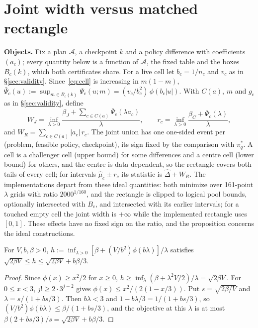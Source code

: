 \documentclass[sigconf,anonymous,review]{acmart}
\newcommand{\cA}{\mathcal{A}}
\begin{document}
\section{Joint width versus matched rectangle}\label{app:widthprop}

\textbf{Objects.} Fix a plan $\cA$, a checkpoint $k$ and a policy difference with coefficients $(a_c)$; every quantity below is a function of $\cA$, the fixed table and the boxes $B_c(k)$, which both certificates share. For a live cell let $b_c = 1/n_c$ and $v_c$ as in \S\ref{sec:validity}. Since~\eqref{eq:cell} is increasing in $m(1-m)$, $\bar\Psi_c(u) := \sup_{m\in B_c(k)} \Psi_c(u;m) = (v_c/b_c^2)\,\phi(b_c|u|)$. With $C(a)$, $m$ and $g_c$ as in \S\ref{sec:validity}, define
\[
W_J = \inf_{\lambda>0}\frac{\beta_J + \sum_{c\in C(a)} \bar\Psi_c(\lambda a_c)}{\lambda},\qquad
r_c = \inf_{\lambda>0}\frac{\beta_C + \bar\Psi_c(\lambda)}{\lambda},
\]
and $W_R = \sum_{c\in C(a)} |a_c|\, r_c$. The joint union has one one-sided event per (problem, feasible policy, checkpoint), its sign fixed by the comparison with $\pi^*_q$. A cell is a challenger cell (upper bound) for some differences and a centre cell (lower bound) for others, and the centre is data-dependent, so the rectangle covers both tails of every cell; for intervals $\hat\mu_c \pm r_c$ its statistic is $\hat\Delta + W_R$. The implementations depart from these ideal quantities: both minimize over 161-point $\lambda$ grids with ratio $2000^{1/160}$, and the rectangle is clipped to logical pool bounds, optionally intersected with $B_c$, and intersected with its earlier intervals; for a touched empty cell the joint width is $+\infty$ while the implemented rectangle uses $[0,1]$. These effects have no fixed sign on the ratio, and the proposition concerns the ideal constructions.

\begin{lemma}\label{lem:sandwich}
For $V, b, \beta > 0$, $h := \inf_{\lambda>0}[\beta + (V/b^2)\phi(b\lambda)]/\lambda$ satisfies $\sqrt{2\beta V} \le h \le \sqrt{2\beta V} + b\beta/3$.
\end{lemma}
\begin{proof}
Since $\phi(x) \ge x^2/2$ for $x\ge0$, $h \ge \inf_\lambda(\beta + \lambda^2V/2)/\lambda = \sqrt{2\beta V}$. For $0 \le x < 3$, $j! \ge 2\cdot 3^{j-2}$ gives $\phi(x) \le x^2/(2(1-x/3))$. Put $s = \sqrt{2\beta/V}$ and $\lambda = s/(1+bs/3)$. Then $b\lambda < 3$ and $1 - b\lambda/3 = 1/(1+bs/3)$, so $(V/b^2)\phi(b\lambda) \le \beta/(1+bs/3)$, and the objective at this $\lambda$ is at most $\beta(2 + bs/3)/s = \sqrt{2\beta V} + b\beta/3$.
\end{proof}
\end{document}
